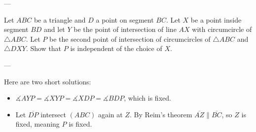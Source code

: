 
---

Let $ABC$ be a triangle and $D$ a point on segment $BC$. Let $X$ be a point inside segment $BD$ and let $Y$ be the point of intersection of line $AX$ with circumcircle of $\triangle ABC$. Let $P$ be the second point of intersection of circumcircles of $\triangle ABC$ and $\triangle DXY$. Show that $P$ is independent of the choice of $X$.

---

Here are two short solutions:
\begin{itemize}
\item $\measuredangle AYP=\measuredangle XYP=\measuredangle XDP=\measuredangle BDP$, which is fixed.
\item Let $\overline{DP}$ intersect $(ABC)$ again at $Z$. By Reim's theorem $\overline{AZ}\parallel\overline{BC}$, so $Z$ is fixed, meaning $P$ is fixed.
\end{itemize}
